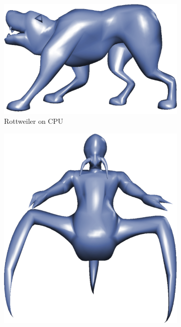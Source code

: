 \begin{figure}
	\centering
	\begin{subfigure}[b]{0.2\textwidth}
		\centering
		\includegraphics[width=\textwidth]{content/img/results/dogCPU.png}
		\caption{Rottweiler on CPU}
		\label{fig:results:cpugpu:cpuDog}
	\end{subfigure}
	\hspace{0.1\textwidth}
	\begin{subfigure}[b]{0.2\textwidth}
		\centering
		\includegraphics[width=\textwidth]{content/img/results/voreCPU.png}

\end{subfigure}
\end{figure}
